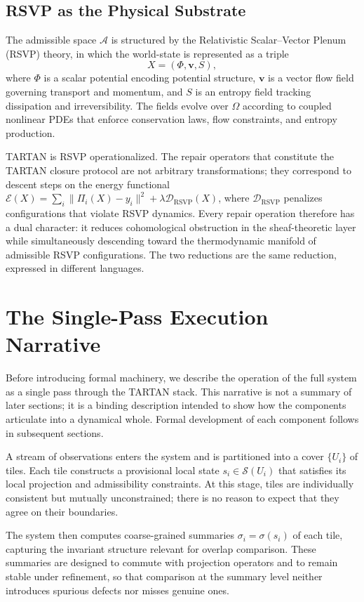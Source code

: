 \documentclass[12pt, oneside]{article}
\begin{document}
\subsection{RSVP as the Physical Substrate}

The admissible space $\mathcal{A}$ is structured by the Relativistic Scalar--Vector Plenum (RSVP) theory, in which the world-state is represented as a triple
\[
X = (\Phi, \mathbf{v}, S),
\]
where $\Phi$ is a scalar potential encoding potential structure, $\mathbf{v}$ is a vector flow field governing transport and momentum, and $S$ is an entropy field tracking dissipation and irreversibility. The fields evolve over $\Omega$ according to coupled nonlinear PDEs that enforce conservation laws, flow constraints, and entropy production.

TARTAN is RSVP operationalized. The repair operators that constitute the TARTAN closure protocol are not arbitrary transformations; they correspond to descent steps on the energy functional $\mathcal{E}(X) = \sum_i \|\Pi_i(X) - y_i\|^2 + \lambda \mathcal{D}_{\text{RSVP}}(X)$, where $\mathcal{D}_{\text{RSVP}}$ penalizes configurations that violate RSVP dynamics. Every repair operation therefore has a dual character: it reduces cohomological obstruction in the sheaf-theoretic layer while simultaneously descending toward the thermodynamic manifold of admissible RSVP configurations. The two reductions are the same reduction, expressed in different languages.

\section{The Single-Pass Execution Narrative}

Before introducing formal machinery, we describe the operation of the full system as a single pass through the TARTAN stack. This narrative is not a summary of later sections; it is a binding description intended to show how the components articulate into a dynamical whole. Formal development of each component follows in subsequent sections.

A stream of observations enters the system and is partitioned into a cover $\{U_i\}$ of tiles. Each tile constructs a provisional local state $s_i \in \mathcal{S}(U_i)$ that satisfies its local projection and admissibility constraints. At this stage, tiles are individually consistent but mutually unconstrained; there is no reason to expect that they agree on their boundaries.

The system then computes coarse-grained summaries $\sigma_i = \sigma(s_i)$ of each tile, capturing the invariant structure relevant for overlap comparison. These summaries are designed to commute with projection operators and to remain stable under refinement, so that comparison at the summary level neither introduces spurious defects nor misses genuine ones.
\end{document}
